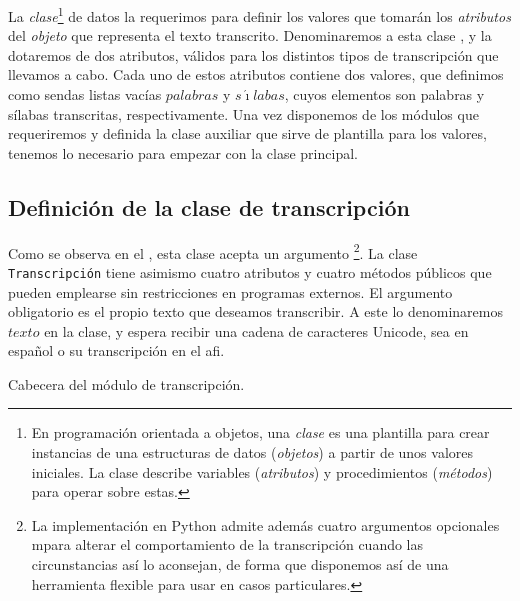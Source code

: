 La \textit{clase}\footnote{En programación orientada a objetos, una \textit{clase} es una plantilla para crear instancias de una estructuras de datos (\textit{objetos}) a partir de unos valores iniciales. La clase describe variables (\textit{atributos}) y procedimientos (\textit{métodos}) para operar sobre estas.} de datos la requerimos para definir los valores que tomarán los \textit{atributos} del \textit{objeto} que representa el texto transcrito. Denominaremos a esta clase \Valoresp, y la dotaremos de dos atributos, válidos para los distintos tipos de transcripción que llevamos a cabo.  Cada uno de estos atributos contiene dos valores, que definimos como sendas listas vacías $palabras$ y $s\acute{\imath}labas$, cuyos elementos son palabras y sílabas transcritas, respectivamente.  Una vez disponemos de los módulos que requeriremos y definida la clase auxiliar que sirve de plantilla para los valores, tenemos lo necesario para empezar con la clase principal.

\subsection{Definición de la clase de transcripción}

Como se observa en el , esta clase acepta un argumento \footnote{La implementación en Python admite además cuatro argumentos opcionales mpara alterar el comportamiento de la transcripción cuando las circunstancias así lo aconsejan, de forma que disponemos así de una herramienta flexible para usar en casos particulares.}. La clase \texttt{Transcripción} tiene asimismo cuatro atributos y cuatro métodos públicos que pueden emplearse sin restricciones en programas externos. El argumento obligatorio es el propio texto que deseamos transcribir. A este lo denominaremos $texto$ en la clase, y espera recibir una cadena de caracteres Unicode, sea en español o su transcripción en el \ac{afi}.

\begin{algorithm}[!ht] %
	\caption{Cabecera del módulo de transcripción.}\label{list:transcriptionheader}
\end{algorithm}

